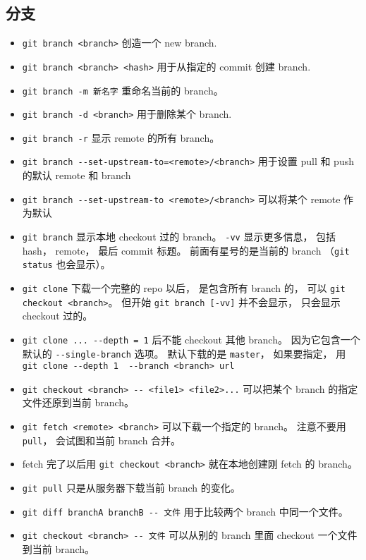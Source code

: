 \subsection{分支}
\begin{itemize}
\item \verb|git branch <branch>| 创造一个 new branch.
\item \verb|git branch <branch> <hash>| 用于从指定的 commit 创建 branch.
\item \verb|git branch -m 新名字| 重命名当前的 branch。
\item \verb|git branch -d <branch>| 用于删除某个 branch.
\item \verb|git branch -r| 显示 remote 的所有 branch。
\item \verb|git branch --set-upstream-to=<remote>/<branch>| 用于设置 pull 和 push 的默认 remote 和 branch
\item \verb|git branch --set-upstream-to <remote>/<branch>| 可以将某个 remote 作为默认
\item \verb|git branch| 显示本地 checkout 过的 branch。 \verb|-vv| 显示更多信息， 包括 hash， remote， 最后 commit 标题。 前面有星号的是当前的 branch （\verb|git status| 也会显示）。
\item \verb|git clone| 下载一个完整的 repo 以后， 是包含所有 branch 的， 可以 \verb|git checkout <branch>|。 但开始 \verb|git branch [-vv]| 并不会显示， 只会显示 checkout 过的。
\item \verb|git clone ... --depth = 1| 后不能 checkout 其他 branch。 因为它包含一个默认的 \verb|--single-branch| 选项。 默认下载的是 \verb|master|， 如果要指定， 用 \verb|git clone --depth 1  --branch <branch> url|
\item \verb|git checkout <branch> -- <file1> <file2>...| 可以把某个 branch 的指定文件还原到当前 branch。
\item \verb|git fetch <remote> <branch>| 可以下载一个指定的 branch。 注意不要用 \verb|pull|， 会试图和当前 branch 合并。
\item fetch 完了以后用 \verb|git checkout <branch>| 就在本地创建刚 fetch 的 branch。
\item \verb|git pull| 只是从服务器下载当前 branch 的变化。
\item \verb|git diff branchA branchB -- 文件| 用于比较两个 branch 中同一个文件。
\item \verb|git checkout <branch> -- 文件| 可以从别的 branch 里面 checkout 一个文件到当前 branch。


\end{itemize}
